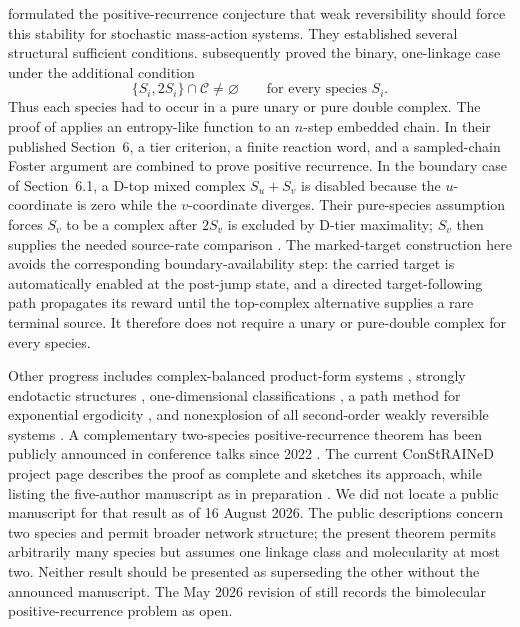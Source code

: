 \citet{AndersonKim2018} formulated the positive-recurrence conjecture that
weak reversibility should force this stability for stochastic mass-action
systems.  They established several structural sufficient conditions.
\citet{AndersonCappellettiKim2020} subsequently proved the binary,
one-linkage case under the additional condition
\begin{equation}\label{eq:ACK-condition}
  \{S_i,2S_i\}\cap\mathcal C\ne\varnothing
  \qquad\text{for every species }S_i.
\end{equation}
Thus each species had to occur in a pure unary or pure double complex.  The
proof of \citet{AndersonCappellettiKim2020} applies an entropy-like function
to an \(n\)-step embedded chain.  In their published Section~6, a tier
criterion, a finite reaction word, and a sampled-chain Foster argument are
combined to prove positive recurrence.  In the boundary case of
Section~6.1, a D-top mixed complex \(S_u+S_v\) is disabled because the
\(u\)-coordinate is zero while the \(v\)-coordinate diverges.  Their
pure-species assumption forces \(S_v\) to be a complex after \(2S_v\) is
excluded by D-tier maximality; \(S_v\) then supplies the needed source-rate
comparison \citep[Section~6, especially Section~6.1]{AndersonCappellettiKim2020}.
The marked-target construction here avoids the corresponding
boundary-availability step: the carried target is automatically enabled at
the post-jump state, and a directed target-following path propagates its
reward until the top-complex alternative supplies a rare terminal source.  It
therefore does not require a unary or pure-double complex for every species.

Other progress includes complex-balanced product-form systems
\citep{AndersonCraciunKurtz2010}, strongly endotactic structures
\citep{AndersonCappellettiKimNguyen2020}, one-dimensional classifications
\citep{WiufXu2023}, a path method for exponential ergodicity
\citep{AndersonCappellettiFanKim2025}, and nonexplosion of all second-order
weakly reversible systems \citep{Xu2026}.  A complementary two-species
positive-recurrence theorem has been publicly announced in conference talks
since 2022 \citep{Agazzi2022Talk,Agazzi2025Talk}.  The current ConStRAINeD
project page describes the proof as complete and sketches its approach, while
listing the five-author manuscript as in preparation
\citep{ConStRAINeDResults}.  We did not locate a public manuscript for that
result as of 16 August 2026.  The public descriptions concern two species and
permit broader network structure; the present theorem permits arbitrarily many
species but assumes one linkage class and molecularity at most two.  Neither
result should be presented as superseding the other without the announced
manuscript.  The May 2026
revision of \citet{Xu2026} still records the bimolecular positive-recurrence
problem as open.

